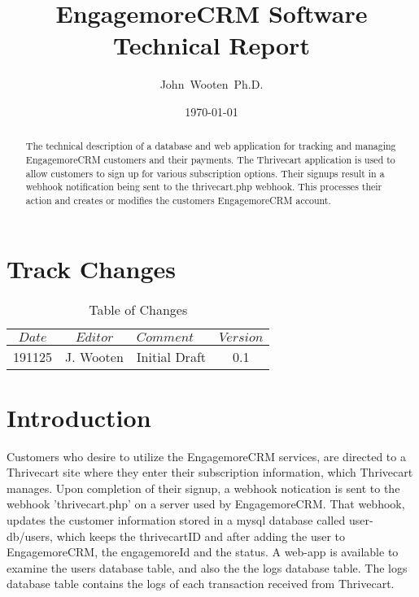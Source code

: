 \documentclass[final,letterpaper,12pt]{article}
\author{John~Wooten~Ph.D.\\
}
\date{\today \\
}
\title{EngagemoreCRM Software Technical Report		}
\begin{document}
\maketitle

\begin {abstract}
\noindent The technical description of a database and web application
for tracking and managing EngagemoreCRM customers and their payments.
The Thrivecart application is used to allow customers to sign up for various
subscription options.  Their signups result in a webhook notification being sent to
the thrivecart.php webhook.  This processes their action and creates or modifies
the customers EngagemoreCRM account.
\end{abstract}
\newpage
\tableofcontents
\newpage
\listoffigures
\listoftables

\newpage
\section{Track Changes}
\begin{table}[h]
\begin{center}
\begin{tabular}{|c|c|l|c|} \hline
$ Date $ & $Editor$ & $Comment$ & $Version$ \\
\hline
191125 & J. Wooten & Initial Draft & 0.1  \\

\hline
\end{tabular}
\end{center}
\caption {Table of Changes}
\label{tab:cqdata0}
\end{table}

\newpage
\section{Introduction}
\noindent Customers who desire to utilize the EngagemoreCRM services, are directed
to a Thrivecart site where they enter their subscription information, which Thrivecart manages.
Upon completion of their signup, a webhook notication is sent to the webhook 'thrivecart.php' on
a server used by EngagemoreCRM.  That webhook, updates the customer information stored in a mysql
database called user-db/users, which keeps the thrivecartID and after adding the user to EngagemoreCRM,
the engagemoreId and the status.  A web-app is available to examine the users database table, and also
the the logs database table. The logs database table contains the logs of each transaction received
from Thrivecart.
\end{document}
